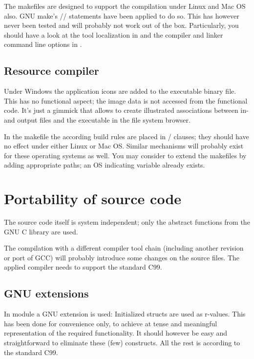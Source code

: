 The makefiles are designed to support the compilation under Linux and Mac
OS also. GNU make's // statements have
been applied to do so. This has however never been tested and will
probably not work out of the box. Particularly, you should have a look at
the tool localization in  and the compiler and linker
command line options in .


\subsection{Resource compiler}

Under Windows the application icons are added to the executable binary
file. This has no functional aspect; the image data is not accessed from
the functional code. It's just a gimmick that allows to create illustrated
associations between \linnet{} in- and output files and the executable in
the file system browser.

In the makefile the according build rules are placed in
/ clauses; they should have no effect under either
Linux or Mac OS. Similar mechanisms will probably exist for these operating
systems as well. You may consider to extend the makefiles by adding
appropriate  paths; an OS indicating variable already exists.


\section{Portability of source code}

The source code itself is system independent; only the abstract functions
from the GNU C library are used.

The compilation with a different compiler tool chain (including another
revision or port of GCC) will probably introduce some changes on the
source files. The applied compiler needs to support the standard C99.


\subsection{GNU extensions}

In module  a GNU extension is used: Initialized
structs are used as r-values. This has been done for convenience only, to
achieve at tense and meaningful representation of the required
functionality. It should however be easy and straightforward to eliminate
these (few) constructs. All the rest is according to the standard C99.


